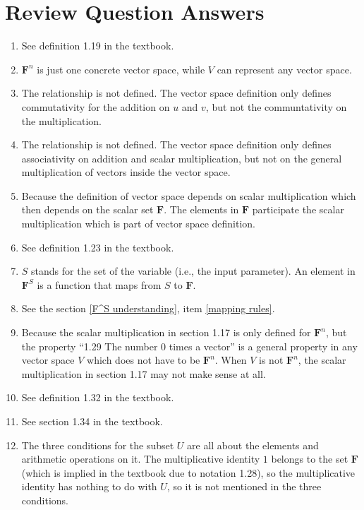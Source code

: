 \documentclass[12pt, letterpaper, oneside]{book}
\begin{document}
\section{Review Question Answers}

\begin{enumerate}
  \item See definition 1.19 in the textbook.
  \item $\mathbf{F}^n$ is just one concrete vector space, while $V$ can
    represent any vector space.
  \item The relationship is not defined. The vector space definition only
    defines commutativity for the addition on $u$ and $v$, but not the
    communtativity on the multiplication.
  \item The relationship is not defined. The vector space definition only
    defines associativity on addition and scalar multiplication, but not on
    the general multiplication of vectors inside the vector space.
  \item Because the definition of vector space depends on scalar multiplication
    which then depends on the scalar set $\mathbf{F}$. The elements in
    $\mathbf{F}$ participate the scalar multiplication which is part of vector
    space definition.
  \item See definition 1.23 in the textbook.
  \item $S$ stands for the set of the variable (i.e., the input parameter). An
    element in $\mathbf{F}^S$ is a function that maps from $S$ to $\mathbf{F}$.
  \item See the section \ref{F^S understanding}, item \ref{mapping rules}.
    \item Because the scalar multiplication in section 1.17 is only defined for
    $\mathbf{F}^n$, but the property ``1.29 The number 0 times a vector'' is a
    general property in any vector space $V$ which does not have to be
    $\mathbf{F}^n$. When $V$ is not $\mathbf{F}^n$, the scalar multiplication
    in section 1.17 may not make sense at all.
  \item See definition 1.32 in the textbook.
  \item See section 1.34 in the textbook.
  \item The three conditions for the subset $U$ are all about the elements and
    arithmetic operations on it. The multiplicative identity $1$ belongs to the
    set $\mathbf{F}$ (which is implied in the textbook due to notation 1.28),
    so the multiplicative identity has nothing to do with $U$, so it is not
    mentioned in the three conditions.
 \end{enumerate}
\end{document}
